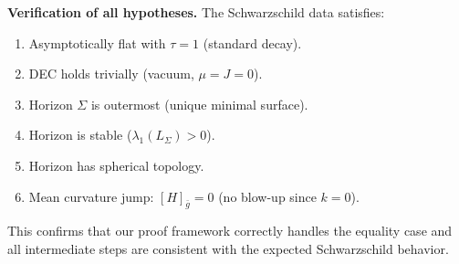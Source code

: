 \begin{example}
\textbf{Verification of all hypotheses.} The Schwarzschild data satisfies:
\begin{enumerate}
    \item[\checkmark] Asymptotically flat with $\tau = 1$ (standard decay).
    \item[\checkmark] DEC holds trivially (vacuum, $\mu = J = 0$).
    \item[\checkmark] Horizon $\Sigma$ is outermost (unique minimal surface).
    \item[\checkmark] Horizon is stable ($\lambda_1(L_\Sigma) > 0$).
    \item[\checkmark] Horizon has spherical topology.
    \item[\checkmark] Mean curvature jump: $[H]_{\bar{g}} = 0$ (no blow-up since $k = 0$).
\end{enumerate}

This confirms that our proof framework correctly handles the equality case and all intermediate steps are consistent with the expected Schwarzschild behavior.
\end{example}

